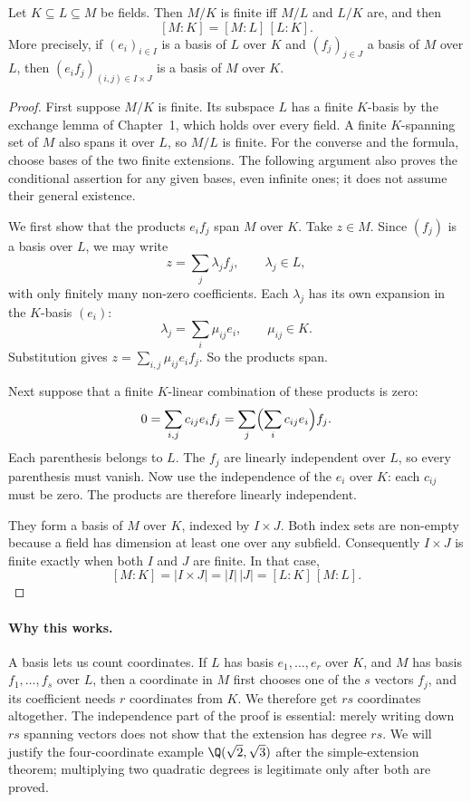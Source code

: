 \begin{theorem}\label{thm:tower}
Let $K\subseteq L\subseteq M$ be fields. Then $M/K$ is finite iff $M/L$ and $L/K$ are, and then
\[
[M:K]=[M:L]\,[L:K].
\]
More precisely, if $(e_i)_{i\in I}$ is a basis of $L$ over $K$ and $(f_j)_{j\in J}$ a basis of $M$ over $L$, then $(e_if_j)_{(i,j)\in I\times J}$ is a basis of $M$ over $K$.
\end{theorem}
\begin{proof}
First suppose $M/K$ is finite. Its subspace $L$ has a finite $K$-basis
by the exchange lemma of Chapter~1, which holds over every field. A finite
$K$-spanning set of $M$ also spans it over $L$, so $M/L$ is finite.
For the converse and the formula, choose bases of the two finite extensions.
The following argument also proves the conditional assertion for any given
bases, even infinite ones; it does not assume their general existence.

We first show that the products $e_if_j$ span $M$ over $K$. Take $z\in M$. Since $(f_j)$ is a basis over $L$, we may write
\[
z=\sum_j\lambda_jf_j,\qquad\lambda_j\in L,
\]
with only finitely many non-zero coefficients. Each $\lambda_j$ has its own expansion in the $K$-basis $(e_i)$:
\[
\lambda_j=\sum_i\mu_{ij}e_i,\qquad\mu_{ij}\in K.
\]
Substitution gives $z=\sum_{i,j}\mu_{ij}e_if_j$. So the products span.

Next suppose that a finite $K$-linear combination of these products is zero:
\[
0=\sum_{i,j}c_{ij}e_if_j
=\sum_j\Bigl(\sum_i c_{ij}e_i\Bigr)f_j.
\]
Each parenthesis belongs to $L$. The $f_j$ are linearly independent over $L$, so every parenthesis must vanish. Now use the independence of the $e_i$ over $K$: each $c_{ij}$ must be zero. The products are therefore linearly independent.

They form a basis of $M$ over $K$, indexed by $I\times J$. Both index sets are non-empty because a field has dimension at least one over any subfield. Consequently $I\times J$ is finite exactly when both $I$ and $J$ are finite. In that case,
\[
[M:K]=|I\times J|=|I|\,|J|=[L:K]\,[M:L].
\]
\end{proof}

\paragraph{Why this works.}
A basis lets us count coordinates. If $L$ has basis $e_1,\ldots,e_r$ over $K$, and $M$ has basis $f_1,\ldots,f_s$ over $L$, then a coordinate in $M$ first chooses one of the $s$ vectors $f_j$, and its coefficient needs $r$ coordinates from $K$. We therefore get $rs$ coordinates altogether. The independence part of the proof is essential: merely writing down $rs$ spanning vectors does not show that the extension has degree $rs$. We will justify the four-coordinate example $\Q(\sqrt2,\sqrt3)$ after the simple-extension theorem; multiplying two quadratic degrees is legitimate only after both are proved.

